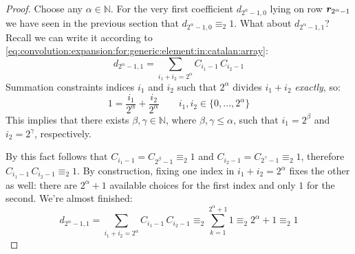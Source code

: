 \begin{proof}
    Choose any $\alpha\in\mathbb{N}$. For the very first coefficient $d_{2^{\alpha}-1,0}$ 
    lying on row $\boldsymbol{r}_{2^{\alpha}-1}$ we have seen in the
    previous section that $d_{2^{\alpha}-1,0}\equiv_{2}1$. What about $d_{2^{\alpha}-1,1}$?
    Recall we can write it according to 
    \autoref{eq:convolution:expansion:for:generic:element:in:catalan:array}:
    \begin{displaymath}
        d_{2^{\alpha}-1,1} = \sum_{i_{1}+ i_{2}=2^{\alpha}}{ C_{i_{1}-1}\,C_{i_{2}-1} }
    \end{displaymath}
    Summation constraints indices $i_{1}$ and $i_{2}$ such that 
    $2^{\alpha}$ divides $i_{1}+i_{2}$ \emph{exactly}, so:
    \begin{displaymath}
        1 = \frac{i_{1}}{2^{\alpha}}+\frac{i_{2}}{2^{\alpha}} \qquad 
            i_{1},i_{2}\in\lbrace 0,\ldots,2^{\alpha}\rbrace
    \end{displaymath}
    This implies that there exists $\beta,\gamma\in\mathbb{N}$, where $\beta,\gamma\leq\alpha$,
    such that $i_{1}=2^{\beta}$ and $i_{2}=2^{\gamma}$, respectively.

    By this fact follows that $C_{i_{1}-1}=C_{2^{\beta}-1}\equiv_{2}1$ and 
    $C_{i_{2}-1}=C_{2^{\gamma}-1}\equiv_{2}1$, therefore $C_{i_{1}-1}\,C_{i_{2}-1}\equiv_{2}1$.
    By construction, fixing one index in  
    $i_{1}+ i_{2}=2^{\alpha}$ fixes the other as well: there are $2^{\alpha}+1$ available choices
    for the first index and only $1$ for the second.
    We're almost finished:
    \begin{displaymath}
        d_{2^{\alpha}-1,1} = \sum_{i_{1}+ i_{2}=2^{\alpha}}{ C_{i_{1}-1}\,C_{i_{2}-1} }
            \equiv_{2} \sum_{k=1}^{2^{\alpha}+1}{1}\equiv_{2} 2^{\alpha}+1\equiv_{2} 1
    \end{displaymath}


\end{proof}
